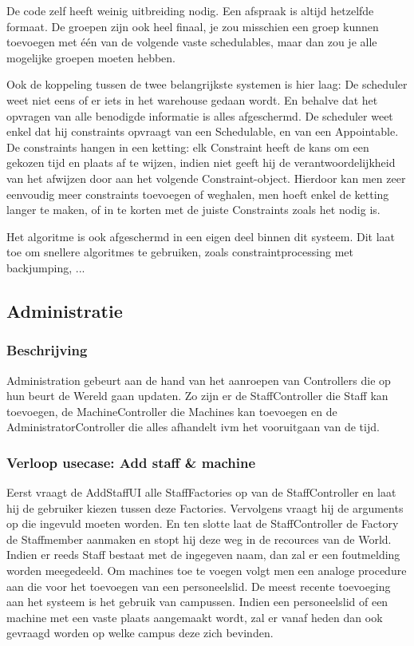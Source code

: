 \documentclass[a4paper]{article}
\begin{document}
De code zelf heeft weinig uitbreiding nodig. Een afspraak is altijd hetzelfde formaat. De groepen zijn ook heel finaal, je zou misschien een groep kunnen toevoegen met één van de volgende vaste schedulables, maar dan zou je alle mogelijke groepen moeten hebben.

Ook de koppeling tussen de twee belangrijkste systemen is hier laag: De scheduler weet niet eens of er iets in het warehouse gedaan wordt. En behalve dat het opvragen van alle benodigde informatie is alles afgeschermd. De scheduler weet enkel dat hij constraints opvraagt van een Schedulable, en van een Appointable.
De constraints hangen in een ketting: elk Constraint heeft de kans om een gekozen tijd en plaats af te wijzen, indien niet geeft hij de verantwoordelijkheid van het afwijzen door aan het volgende Constraint-object. Hierdoor kan men zeer eenvoudig meer constraints toevoegen of weghalen, men hoeft enkel de ketting langer te maken, of in te korten met de juiste Constraints zoals het nodig is.

Het algoritme is ook afgeschermd in een eigen deel binnen dit systeem. Dit laat toe om snellere algoritmes te gebruiken, zoals constraintprocessing met backjumping, ...

\subsection{Administratie}
\subsubsection{Beschrijving}
Administration gebeurt aan de hand van het aanroepen van Controllers die op hun beurt de Wereld gaan updaten. Zo zijn er de StaffController die Staff kan toevoegen, de MachineController die Machines kan toevoegen en de AdministratorController die alles afhandelt ivm het vooruitgaan van de tijd.
\subsubsection{Verloop usecase: Add staff \& machine}
Eerst vraagt de AddStaffUI alle StaffFactories op van de StaffController en laat hij de gebruiker kiezen tussen deze Factories. Vervolgens vraagt hij de arguments op die ingevuld moeten worden. En ten slotte laat de StaffController de Factory de Staffmember aanmaken en stopt hij deze weg in de recources van de World. Indien er reeds Staff bestaat met de ingegeven naam, dan zal er een foutmelding worden meegedeeld.
Om machines toe te voegen volgt men een analoge procedure aan die voor het toevoegen van een personeelslid.
De meest recente toevoeging aan het systeem is het gebruik van campussen. Indien een personeelslid of een machine met een vaste plaats aangemaakt wordt, zal er vanaf heden dan ook gevraagd worden op welke campus deze zich bevinden.
\end{document}
